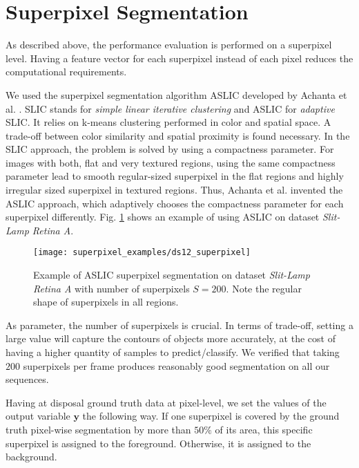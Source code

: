 \section{Superpixel Segmentation} \label{superpixel_segm}
As described above, the performance evaluation is performed on a superpixel level. Having a feature vector for each superpixel instead of each pixel reduces the computational requirements. 

We used the superpixel segmentation algorithm ASLIC developed by Achanta et al. \cite{achanta12}.
SLIC stands for \textit{simple linear iterative clustering} and ASLIC for \textit{adaptive} SLIC. It relies on k-means clustering performed in color and spatial space. A trade-off between color similarity and spatial proximity is found necessary. In the SLIC approach, the problem is solved by using a compactness parameter. For images with both, flat and very textured regions, using the same compactness parameter lead to smooth regular-sized superpixel in the flat regions and highly irregular sized superpixel in textured regions. Thus, Achanta et al. invented the ASLIC approach, which adaptively chooses the compactness parameter for each superpixel differently. Fig. \ref{fig:ExSuperpixel} shows an example of using ASLIC on dataset \textit{Slit-Lamp Retina A}.

\begin{figure}[!htbp]
  \centering
  \label{fig:subfig:example_superpixel}
  \texttt{[image: superpixel\_examples/ds12\_superpixel]}
  \caption[Example of superpixel segmentation]{Example of ASLIC superpixel segmentation on dataset \textit{Slit-Lamp Retina A} with number of superpixels $S=200$. Note the regular shape of superpixels in all regions.}
  \label{fig:ExSuperpixel}
\end{figure}

As parameter, the number of superpixels is crucial. In terms of trade-off, setting a large value will capture the contours of objects more accurately, at the cost of having a higher quantity of samples to predict/classify. We verified that taking $200$ superpixels per frame produces reasonably good segmentation on all our sequences.

Having at disposal ground truth data at pixel-level, we set the values of the output variable $\boldsymbol{y}$ the following way.
If one superpixel is covered by the ground truth pixel-wise segmentation by more than $50\%$ of its area, this specific superpixel is assigned to the foreground. Otherwise, it is assigned to the background.

